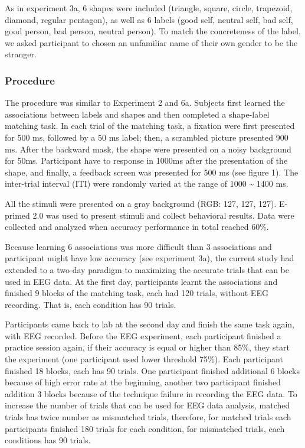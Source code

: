 \documentclass[
  english,
  man]{apa6}
\begin{document}
As in experiment 3a, 6 shapes were included (triangle, square, circle, trapezoid, diamond, regular pentagon), as well as 6 labels (good self, neutral self, bad self, good person, bad person, neutral person). To match the concreteness of the label, we asked participant to chosen an unfamiliar name of their own gender to be the stranger.

\hypertarget{procedure-10}{%
\subsubsection{Procedure}\label{procedure-10}}

The procedure was similar to Experiment 2 and 6a. Subjects first learned the associations between labels and shapes and then completed a shape-label matching task. In each trial of the matching task, a fixation were first presented for 500 ms, followed by a 50 ms label; then, a scrambled picture presented 900 ms. After the backward mask, the shape were presented on a noisy background for 50ms. Participant have to response in 1000ms after the presentation of the shape, and finally, a feedback screen was presented for 500 ms (see figure 1). The inter-trial interval (ITI) were randomly varied at the range of 1000 \textasciitilde{} 1400 ms.

All the stimuli were presented on a gray background (RGB: 127, 127, 127). E-primed 2.0 was used to present stimuli and collect behavioral results. Data were collected and analyzed when accuracy performance in total reached 60\%.

Because learning 6 associations was more difficult than 3 associations and participant might have low accuracy (see experiment 3a), the current study had extended to a two-day paradigm to maximizing the accurate trials that can be used in EEG data. At the first day, participants learnt the associations and finished 9 blocks of the matching task, each had 120 trials, without EEG recording. That is, each condition has 90 trials.

Participants came back to lab at the second day and finish the same task again, with EEG recorded. Before the EEG experiment, each participant finished a practice session again, if their accuracy is equal or higher than 85\%, they start the experiment (one participant used lower threshold 75\%). Each participant finished 18 blocks, each has 90 trials. One participant finished additional 6 blocks because of high error rate at the beginning, another two participant finished addition 3 blocks because of the technique failure in recording the EEG data. To increase the number of trials that can be used for EEG data analysis, matched trials has twice number as mismatched trials, therefore, for matched trials each participants finished 180 trials for each condition, for mismatched trials, each conditions has 90 trials.
\end{document}
